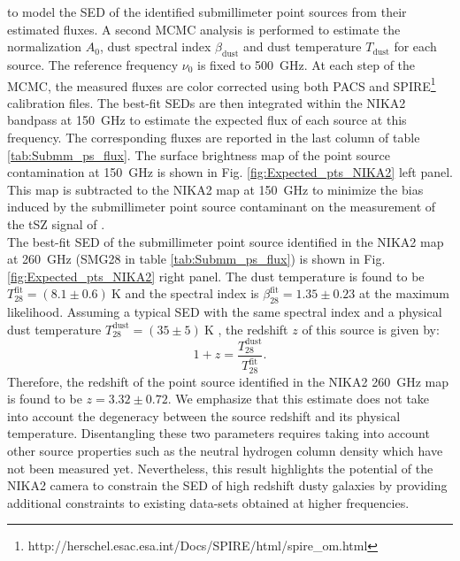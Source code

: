 \documentclass[traditabstract]{aa}
\begin{document}
to model the SED of the identified submillimeter point sources from their estimated fluxes. A second MCMC analysis is performed to estimate the normalization $A_0$, dust spectral index $\beta_{\mathrm{dust}}$ and dust temperature $T_{\mathrm{dust}}$ for each source. The reference frequency $\nu_0$ is fixed to 500~GHz. At each step of the MCMC, the measured fluxes are color corrected using both PACS \citep{pog10} and SPIRE\footnote{http://herschel.esac.esa.int/Docs/SPIRE/html/spire\_om.html} calibration files. The best-fit SEDs are then integrated within the NIKA2 bandpass at 150~GHz to estimate the expected flux of each source at this frequency. The corresponding fluxes are reported in the last column of table \ref{tab:Submm_ps_flux}. The surface brightness map of the point source contamination at 150~GHz is shown in Fig. \ref{fig:Expected_pts_NIKA2} left panel. This map is subtracted to the NIKA2 map at 150~GHz to minimize the bias induced by the submillimeter point source contaminant on the measurement of the tSZ signal of \psz.\\
\indent The best-fit SED of the submillimeter point source identified in the NIKA2 map at 260~GHz (SMG28 in table \ref{tab:Submm_ps_flux}) is shown in Fig. \ref{fig:Expected_pts_NIKA2} right panel. The dust temperature is found to be $T_{\mathrm{28}}^{\mathrm{fit}} = (8.1 \pm 0.6)~\mathrm{K}$ and the spectral index is $\beta_{\mathrm{28}}^{\mathrm{fit}} = 1.35 \pm 0.23$ at the maximum likelihood. Assuming a typical SED with the same spectral index and a physical dust temperature $T_{\mathrm{28}}^{\mathrm{dust}} = (35 \pm 5)~\mathrm{K}$ \citep[see \emph{e.g.}][]{pla16e}, the redshift $z$ of this source is given by:
\begin{equation}
        1+z = \frac{T_{\mathrm{28}}^{\mathrm{dust}}}{T_{\mathrm{28}}^{\mathrm{fit}}}.
\label{eq:redshift_sou}
\end{equation}
Therefore, the redshift of the point source identified in the NIKA2 260~GHz map is found to be $z = 3.32 \pm 0.72$. We emphasize that this estimate does not take into account the degeneracy between the source redshift and its physical temperature. Disentangling these two parameters requires taking into account other source properties such as the neutral hydrogen column density which have not been measured yet. Nevertheless, this result highlights the potential of the NIKA2 camera to constrain the SED of high redshift dusty galaxies by providing additional constraints to existing data-sets obtained at higher frequencies.
\end{document}
